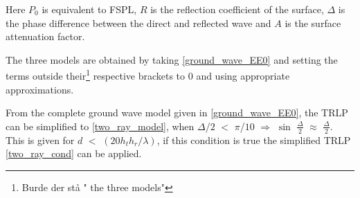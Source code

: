 Here $P_{0}$ is equivalent to FSPL, $R$ is the reflection coefficient of the surface, $\Delta$ is the phase difference between the direct and reflected wave and $A$ is the surface attenuation factor.

The three models are obtained by taking \eqref{ground_wave_EE0} and setting the terms outside their\footnote{Burde der stå " the three models"} respective brackets to 0 and using appropriate approximations.

From the complete ground wave model given in \eqref{ground_wave_EE0}, the TRLP can be simplified to \eqref{two_ray_model}, 
when $\Delta$/$2$ $<$ $\pi$/$10$ $\Rightarrow$ $\sin$ $\frac{\Delta}{2}$ $\approx$ $\frac{\Delta}{2}$. This is given for $d$ $<$ $(20h_{t}h_{r}/\lambda)$, if this condition is true the simplified TRLP \eqref{two_ray_cond} can be applied.  
  
  
















